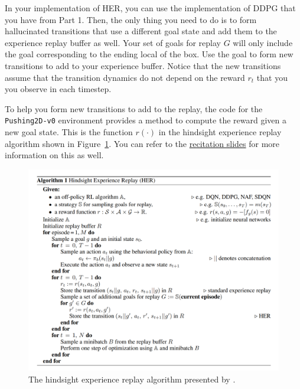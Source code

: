 \documentclass[12pt]{article}
\begin{document}
In your implementation of HER, you can use the implementation of DDPG that you have from Part 1.  Then, the only thing you need to do is to form hallucinated transitions that use a different goal state and add them to the experience replay buffer as well.  Your set of goals for replay $G$ will only include the goal corresponding to the ending local of the box.  Use the goal to form new transitions to add to your experience buffer.  Notice that the new transitions assume that the transition dynamics do not depend on the reward $r_t$ that you you observe in each timestep.

To help you form new transitions to add to the replay, the code for the \texttt{Pushing2D-v0} environment provides a method to compute the reward given a new goal state.  This is the function $r(\cdot)$ in the hindsight experience replay algorithm shown in Figure~\ref{fig:her}.  You can refer to the \href{https://docs.google.com/presentation/d/1ueiyyXN_v7h_4GGa4NtMBau0Du1wpZstS3pfJIds37U/edit?usp=sharing}{recitation slides} for more information on this as well.

\begin{figure}[h]
    \centering
    \includegraphics[width=1\textwidth]{her}
    \caption{The hindsight experience replay algorithm presented by \cite{DBLP:journals/corr/AndrychowiczWRS17}.}
    \label{fig:her}
\end{figure}
\end{document}
